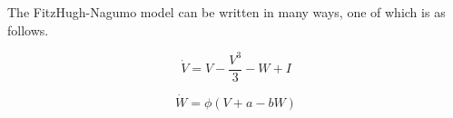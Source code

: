 \documentclass[../Orator]{subfiles}
\begin{document}
The FitzHugh-Nagumo model can be written in many ways, one of which is as follows.

\begin{equation}
    \dot{V}=V-\frac{V^{3}}{3}-W+I
\end{equation}

\begin{equation}
    \dot{W}=\phi (V+a-bW)
\end{equation}

\begin{comment}
    Finding the equilibria 
    Find null clines:
        If we use the original
            phi=0.08
            a=0.7
            b=0.8
            We get one equilibrium
        If we use a different value for b, eg.:
            b=-0.8
            We get three equilibria
\end{comment}
\end{document}
